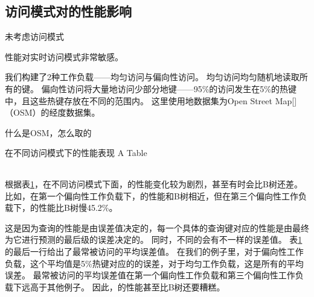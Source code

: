 \subsection{访问模式对{\li}的性能影响}

{\li}未考虑访问模式

{\li}性能对实时访问模式非常敏感。

我们构建了2种工作负载{------}均匀访问与偏向性访问。
均匀访问均匀随机地读取所有的键。
偏向性访问将大量地访问少部分地键{------}95\%的访问发生在5\%的热键中，且这些热键存放在不同的范围内。
这里使用地数据集为Open Street Map[]（OSM）的经度数据集。

什么是OSM，怎么取的


\begin{table}[!hpb]
  \centering
  \bicaption[指向一个表格的表目录索引]
    {{\li}在不同访问模式下的性能表现}
    {A Table}
  \label{tab:pattern}
  \begin{tabular}{@{}llr@{}} \toprule
  \end{tabular}
\end{table}

根据表\ref{tab:pattern}，在不同访问模式下面，{\li}的性能变化较为剧烈，甚至有时会比B树还差。
比如，在第一个偏向性工作负载下，{\li}的性能和B树相近，但在第三个偏向性工作负载下，{\li}的性能比B树慢45.2\%。

这是因为查询的性能是由误差值决定的，每一个具体的查询键对应的性能是由最终为它进行预测的最后级{\model}的误差决定的。
同时，不同的{\model}会有不一样的误差值。
表\ref{tab:pattern}的最后一行给出了最常被访问{\model}的平均误差值。
在我们的例子里，对于偏向性工作负载，这个平均值是5\%热键对应的{\model}的误差，对于均匀工作负载，这是所有{\model}的平均误差。
最常被访问{\model}的平均误差值在第一个偏向性工作负载和第三个偏向性工作负载下远高于其他例子。
因此，{\li}的性能甚至比B树还要糟糕。


